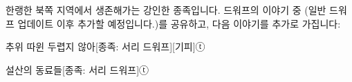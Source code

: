 \documentclass{report}
\begin{document}
	한랭한 북쪽 지역에서 생존해가는 강인한 종족입니다. 드워프의 이야기 중 (일반 드워프 업데이트 이후 추가할 예정입니다.)를 공유하고, 다음 이야기를 추가로 가집니다:
	
	\begin{story}{추위 따윈 두렵지 않아}{[종족: 서리 드워프][기피]ⓣ}
		
		
	\end{story}
	
	\begin{story}{설산의 동료들}{[종족: 서리 드워프]ⓣ}
		
	\end{story}
\end{document}
